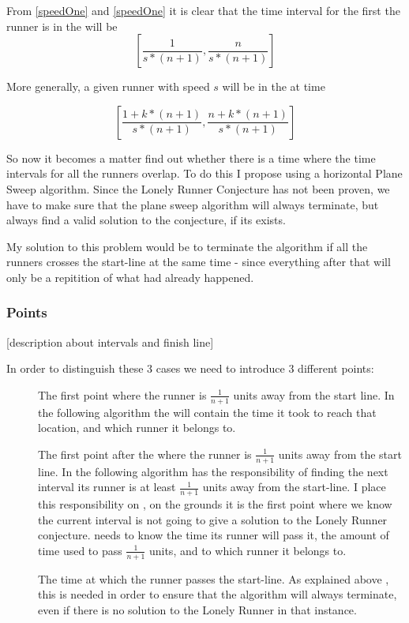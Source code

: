 From \ref{speedOne} and \ref{speedOne} it is clear that the time interval for the first the runner is in the \zone will be 
\begin{displaymath}
\left[\frac{1}{s * (n+1)}, \frac{n}{s * (n+1)}\right]
\end{displaymath}

More generally, a given runner with speed $s$ will be in the \zone at time 

\begin{displaymath}
\left[\frac{1 + k * (n+1)}{s * (n+1)}, \frac{n + k * (n+1)}{s * (n+1)}\right] 
\end{displaymath}

So now it becomes a matter find out whether there is a time where the time intervals for all the runners overlap. To do this I propose using a horizontal Plane Sweep algorithm. Since the Lonely Runner Conjecture has not been proven, we have to make sure that the plane sweep algorithm will always terminate, but always find a valid solution to the conjecture, if its exists.

My solution to this problem would be to terminate the algorithm if all the runners crosses the start-line at the same time - since everything after that will only be a repitition of what had already happened.

\subsubsection{Points}

[description about intervals and finish line]

In order to distinguish these 3 cases we need to introduce 3 different points:
\begin{description}
\item[\comStart] The first point where the runner is $\frac{1}{n + 1}$ units away from the start line. In the following algorithm the \comStart will contain the time it took to reach that location, and which runner it belongs to.
\item[\comEnd] The first point after the \comStart where the runner is $\frac{1}{n + 1}$ units away from the start line. In the following algorithm \comEnd has the responsibility of finding the next interval its runner is at least $\frac{1}{n+1}$ units away from the start-line. I place this responsibility on \comEnd, on the grounds it is the first point where we know the current interval is not going to give a solution to the Lonely Runner conjecture. \comEnd needs to know the time its runner will pass it, the amount of time used to pass $\frac{1}{n+1}$ units, and to which runner it belongs to.
\item[\comFin] The time at which the runner passes the start-line. As explained above , this is needed in order to ensure that the algorithm will always terminate, even if there is no solution to the Lonely Runner in that instance.
\end{description}

